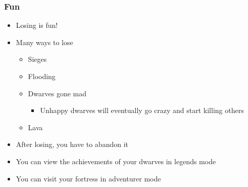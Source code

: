 \begin{frame}
\frametitle{Fun}
\begin{itemize}
\item Losing is fun!
\item Many ways to lose
\begin{itemize}
	\item Sieges
	\item Flooding
	\item Dwarves gone mad
	\begin{itemize}
		\item Unhappy dwarves will eventually go crazy and start killing others
	\end{itemize}
	\item Lava
\end{itemize}
\item After losing, you have to abandon it
\item You can view the achievements of your dwarves in legends mode
\item You can visit your fortress in adventurer mode
\end{itemize}
\end{frame}
